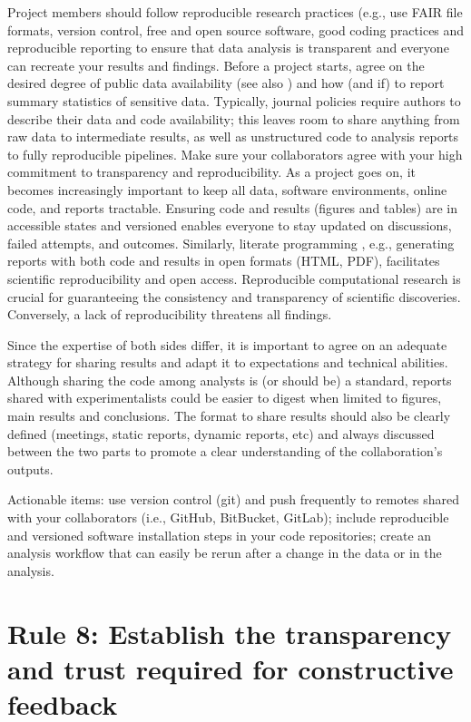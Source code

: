 \documentclass{article}
\begin{document}
Project members should follow reproducible research practices (e.g., use FAIR file formats, version control, free and open source software, good coding practices and reproducible reporting \cite{wilkinson2016fair,sandve2013ten,stawarczyk2023establishing} to ensure that data analysis is transparent and everyone can recreate your results and findings. Before a project starts, agree on the desired degree of public data availability (see also ) and how (and if) to report summary statistics of sensitive data. Typically, journal policies require authors to describe their data and code availability; this leaves room to share anything from raw data to intermediate results, as well as unstructured code to analysis reports to fully reproducible pipelines. Make sure your collaborators agree with your high commitment to transparency and reproducibility. As a project goes on, it becomes increasingly important to keep all data, software environments, online code, and reports tractable. Ensuring code and results (figures and tables) are in accessible states and versioned enables everyone to stay updated on discussions, failed attempts, and outcomes. Similarly, literate programming \cite{knuth1984literate}, e.g., generating reports with both code and results in open formats (HTML, PDF), facilitates scientific reproducibility and open access. Reproducible computational research is crucial for guaranteeing the consistency and transparency of scientific discoveries. Conversely, a lack of reproducibility threatens all findings.

Since the expertise of both sides differ, it is important to agree on an adequate strategy for sharing results and adapt it to expectations and technical abilities. Although sharing the code among analysts is (or should be) a standard, reports shared with experimentalists could be easier to digest when limited to figures, main results and conclusions. The format to share results should also be clearly defined (meetings, static reports, dynamic reports, etc) and always discussed between the two parts to promote a clear understanding of the collaboration's outputs.   

Actionable items: use version control (git) and push frequently to remotes shared with your collaborators (i.e., GitHub, BitBucket, GitLab); include reproducible and versioned software installation steps in your code repositories; create an analysis workflow that can easily be rerun after a change in the data or in the analysis.

\section*{Rule 8: Establish the transparency and trust required for constructive feedback} %
\label{rule8_trust}
\end{document}

